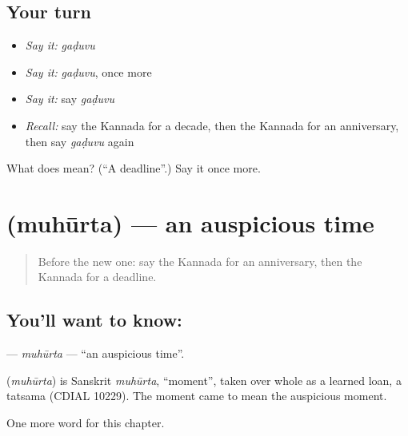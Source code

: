 \subsection*{Your turn}
\begin{itemize}
\raggedright
  \item \emph{Say it:} \emph{gaḍuvu}
  \item \emph{Say it:} \emph{gaḍuvu}, once more
  \item \emph{Say it:} say \emph{gaḍuvu}
  \item \emph{Recall:} say the Kannada for a decade, then the Kannada for an anniversary, then say \emph{gaḍuvu} again
\end{itemize}

\begin{tcolorbox}[breakable,colback=teal!4,colframe=teal!35!black,title={Before you move on}]
What does  mean? (\textquotedblleft{}A deadline\textquotedblright{}.) Say it once more.
\end{tcolorbox}
\section[\texorpdfstring{\kn{ಮುಹೂರ್ತ} (muhūrta)}{ಮುಹೂರ್ತ (muhūrta)}]{ (muhūrta) — an auspicious time}

\label{lesson:KA-C248-muhurta}



\begin{quote}
Before the new one: say the Kannada for an anniversary, then the Kannada for a deadline.
\end{quote}

\subsection*{You'll want to know: }
\textbf{} — \emph{muhūrta} — \textquotedblleft{}an auspicious time\textquotedblright{}.

\begin{cousinweb}
\textbf{} (\emph{muhūrta}) is Sanskrit \emph{muhūrta}, \textquotedblleft{}moment\textquotedblright{}, taken over whole as a learned loan, a tatsama (CDIAL 10229). The moment came to mean the auspicious moment.
\end{cousinweb}

\begin{grammarlens}[title={What you've built}]
One more word for this chapter.
\end{grammarlens}

